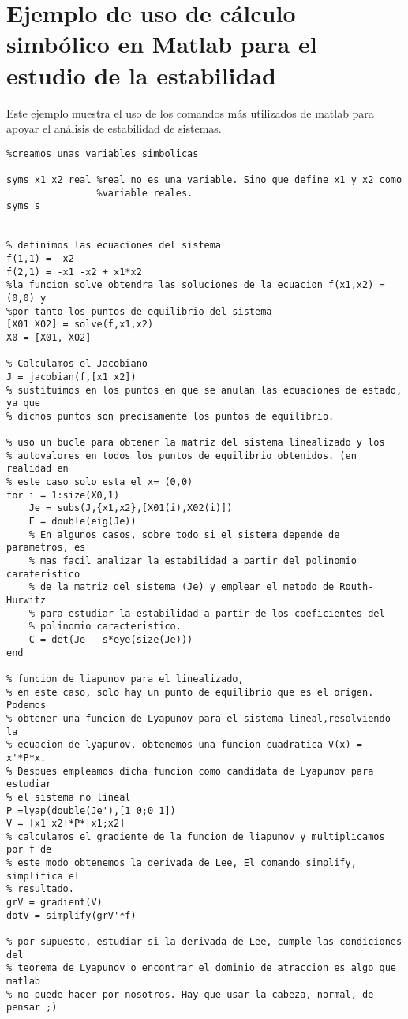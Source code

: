 \chapter{Ejemplo de uso de cálculo simbólico en Matlab para el estudio de la estabilidad}
Este ejemplo muestra el uso de los comandos más utilizados de matlab para apoyar el análisis de estabilidad de sistemas.

\begin{lstlisting}
%creamos unas variables simbolicas

syms x1 x2 real %real no es una variable. Sino que define x1 y x2 como
                %variable reales. 
syms s


% definimos las ecuaciones del sistema
f(1,1) =  x2
f(2,1) = -x1 -x2 + x1*x2 
%la funcion solve obtendra las soluciones de la ecuacion f(x1,x2) =(0,0) y
%por tanto los puntos de equilibrio del sistema
[X01 X02] = solve(f,x1,x2)
X0 = [X01, X02]

% Calculamos el Jacobiano
J = jacobian(f,[x1 x2])
% sustituimos en los puntos en que se anulan las ecuaciones de estado, ya que
% dichos puntos son precisamente los puntos de equilibrio. 

% uso un bucle para obtener la matriz del sistema linealizado y los
% autovalores en todos los puntos de equilibrio obtenidos. (en realidad en
% este caso solo esta el x= (0,0)
for i = 1:size(X0,1)
    Je = subs(J,{x1,x2},[X01(i),X02(i)])
    E = double(eig(Je))
    % En algunos casos, sobre todo si el sistema depende de parametros, es
    % mas facil analizar la estabilidad a partir del polinomio carateristico
    % de la matriz del sistema (Je) y emplear el metodo de Routh-Hurwitz
    % para estudiar la estabilidad a partir de los coeficientes del
    % polinomio caracteristico.
    C = det(Je - s*eye(size(Je)))
end

% funcion de liapunov para el linealizado,
% en este caso, solo hay un punto de equilibrio que es el origen. Podemos
% obtener una funcion de Lyapunov para el sistema lineal,resolviendo la
% ecuacion de lyapunov, obtenemos una funcion cuadratica V(x) = x'*P*x. 
% Despues empleamos dicha funcion como candidata de Lyapunov para estudiar
% el sistema no lineal
P =lyap(double(Je'),[1 0;0 1])
V = [x1 x2]*P*[x1;x2]
% calculamos el gradiente de la funcion de liapunov y multiplicamos por f de
% este modo obtenemos la derivada de Lee, El comando simplify, simplifica el
% resultado.
grV = gradient(V)
dotV = simplify(grV'*f)

% por supuesto, estudiar si la derivada de Lee, cumple las condiciones del
% teorema de Lyapunov o encontrar el dominio de atraccion es algo que matlab
% no puede hacer por nosotros. Hay que usar la cabeza, normal, de pensar ;)


\end{lstlisting}
